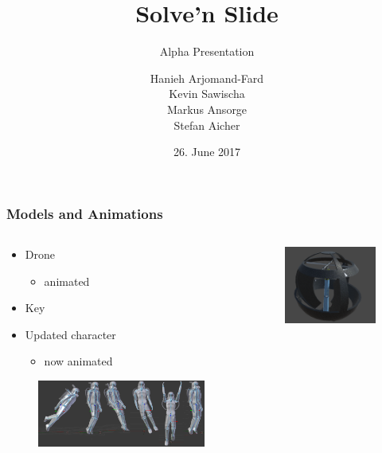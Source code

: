 \documentclass[xcolor=dvipsnames]{beamer}
\title{Solve'n Slide}
\subtitle{Alpha Presentation}
\author{Hanieh Arjomand-Fard\\Kevin Sawischa\\Markus Ansorge\\Stefan Aicher}
\date{26. June 2017}
\begin{document}
	\maketitle
	
	\begin{frame}
		\frametitle{Models and Animations}
		\begin{columns}[T]
			\begin{column}{0.7\textwidth}
				\begin{itemize}
					\item Drone
					\begin{itemize}
						\item animated
					\end{itemize}
					\item Key
					\item Updated character
					\begin{itemize}
						\item now animated
					\end{itemize}
				\end{itemize}
				\begin{figure}[ht]
					\includegraphics[scale=0.36]{images/alpha/allAnimations}
				\end{figure}
			\end{column}
			\begin{column}{0.3\textwidth}
				\begin{figure}[ht]
					\includegraphics[scale=0.25]{images/alpha/drone}

\end{figure}
\end{column}
\end{columns}
\end{frame}
\end{document}
